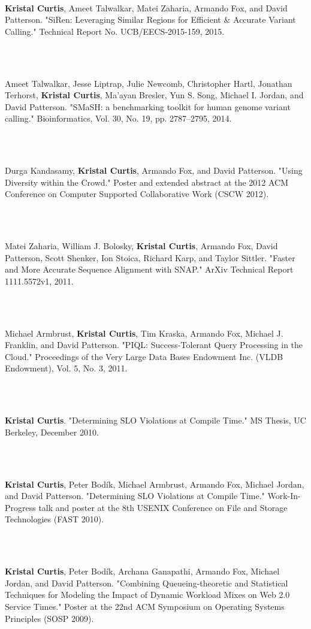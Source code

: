 \documentclass[11pt]{article}
\newcommand{\pagewidth}{6.8 in}
\newcommand{\tabwidth}{1.5 in}
\begin{document}
\begin{tabbing}
\hspace{\tabwidth} \= \\ 

\parbox[t]{\pagewidth}{\textbf{Kristal Curtis}, Ameet Talwalkar, Matei Zaharia, Armando Fox, and David Patterson.  "SiRen:  Leveraging Similar Regions for Efficient \& Accurate Variant Calling."  Technical Report No. UCB/EECS-2015-159, 2015.}\\ \\
\parbox[t]{\pagewidth}{Ameet Talwalkar, Jesse Liptrap, Julie Newcomb, Christopher Hartl, Jonathan Terhorst, \textbf{Kristal Curtis}, Ma'ayan Bresler, Yun S. Song, Michael I. Jordan, and David Patterson.  "SMaSH:  a benchmarking toolkit for human genome variant calling."  Bioinformatics, Vol. 30, No. 19, pp. 2787--2795, 2014.}\\ \\
\parbox[t]{\pagewidth}{Durga Kandasamy, \textbf{Kristal Curtis}, Armando Fox, and David Patterson.  "Using Diversity within the Crowd."  Poster and extended abstract at the 2012 ACM Conference on Computer Supported Collaborative Work (CSCW 2012).}\\ \\
\parbox[t]{\pagewidth}{Matei Zaharia, William J. Bolosky, \textbf{Kristal Curtis}, Armando Fox, David Patterson, Scott Shenker, Ion Stoica, Richard Karp, and Taylor Sittler.  "Faster and More Accurate Sequence Alignment with SNAP."  ArXiv Technical Report 1111.5572v1, 2011.}\\ \\
\parbox[t]{\pagewidth}{Michael Armbrust, \textbf{Kristal Curtis}, Tim Kraska, Armando Fox, Michael J. Franklin, and David Patterson.  "PIQL:  Success-Tolerant Query Processing in the Cloud."  Proceedings of the Very Large Data Bases Endowment Inc. (VLDB Endowment), Vol. 5, No. 3, 2011.}\\ \\
\parbox[t]{\pagewidth}{\textbf{Kristal Curtis}.  "Determining SLO Violations at Compile Time."  MS Thesis, UC Berkeley, December 2010.}\\ \\
\parbox[t]{\pagewidth}{\textbf{Kristal Curtis}, Peter Bod\'{i}k, Michael Armbrust, Armando Fox, Michael Jordan, and David Patterson.  "Determining SLO Violations at Compile Time."  Work-In-Progress talk and poster at the 8th USENIX Conference on File and Storage Technologies (FAST 2010).}\\ \\
\parbox[t]{\pagewidth}{\textbf{Kristal Curtis}, Peter Bod\'{i}k, Archana Ganapathi, Armando Fox, Michael Jordan, and David Patterson.  "Combining Queueing-theoretic and Statistical Techniques for Modeling the Impact of Dynamic Workload Mixes on Web 2.0 Service Times."  Poster at the 22nd ACM Symposium on Operating Systems Principles (SOSP 2009).}\\
\end{tabbing}
\end{document}
